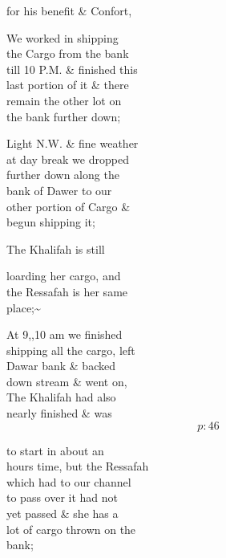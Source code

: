 \documentclass{report}
\begin{document}

	\par{
 	for his benefit \& Confort,\ \\
	}

	\par{
 	We worked in shipping\ \\the Cargo from the bank\ \\till 10 P.M. \& finished this\ \\last portion of it \& there\ \\remain the other lot on\ \\the bank further down;\ \\
	}

	\par{
 	Light N.W. \& fine weather\ \\at day break we dropped\ \\further down along the\ \\bank of Dawer to our\ \\other portion of Cargo \&\ \\begun shipping it;\ \\
	}

	\par{
 	The Khalifah is still\ \\
	}

	\par{
 	loarding her cargo, and\ \\the Ressafah is her same\ \\place;\~{}\ \\
	}

	\par{
 	At 9,,10 am we finished\ \\shipping all the cargo, left\ \\Dawar bank \& backed\ \\down stream \& went on,\ \\The Khalifah had also\ \\nearly finished \& was\ \\
  \[p: 46 \]

	}

	\par{
 	to start in about an\ \\hours time, but the Ressafah\ \\which had to our channel\ \\to pass over it had not\ \\yet passed \& she has a\ \\lot of cargo thrown on the\ \\bank;\ \\
	}
\end{document}
